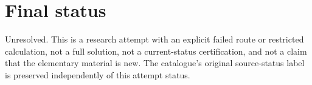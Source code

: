 \documentclass[11pt,a4paper]{article}
\begin{document}
\section{Final status}
Unresolved. This is a research attempt with an explicit failed route or restricted
calculation, not a full solution, not a current-status certification, and not a claim
that the elementary material is new. The catalogue's original source-status label
is preserved independently of this attempt status.
\end{document}
